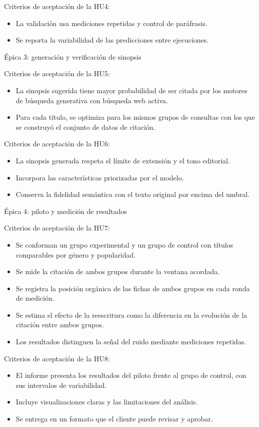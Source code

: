 \documentclass[
11pt, %
codirector, %
]{charter}
\begin{document}
Criterios de aceptación de la HU4:
\begin{itemize}
	\item La validación usa mediciones repetidas y control de paráfrasis.
	\item Se reporta la variabilidad de las predicciones entre ejecuciones.
\end{itemize}

Épica 3: generación y verificación de sinopsis

Criterios de aceptación de la HU5:
\begin{itemize}
	\item La sinopsis sugerida tiene mayor probabilidad de ser citada por los motores de búsqueda generativa con búsqueda web activa.
	\item Para cada título, se optimiza para los mismos grupos de consultas con los que se construyó el conjunto de datos de citación.
\end{itemize}

Criterios de aceptación de la HU6:
\begin{itemize}
	\item La sinopsis generada respeta el límite de extensión y el tono editorial.
	\item Incorpora las características priorizadas por el modelo.
	\item Conserva la fidelidad semántica con el texto original por encima del umbral.
\end{itemize}


Épica 4: piloto y medición de resultados

Criterios de aceptación de la HU7:
\begin{itemize}
	\item Se conforman un grupo experimental y un grupo de control con títulos comparables por género y popularidad.
	\item Se mide la citación de ambos grupos durante la ventana acordada.
	\item Se registra la posición orgánica de las fichas de ambos grupos en cada ronda de medición.
	\item Se estima el efecto de la reescritura como la diferencia en la evolución de la citación entre ambos grupos.
	\item Los resultados distinguen la señal del ruido mediante mediciones repetidas.
\end{itemize}

Criterios de aceptación de la HU8:
\begin{itemize}
	\item El informe presenta los resultados del piloto frente al grupo de control, con sus intervalos de variabilidad.
	\item Incluye visualizaciones claras y las limitaciones del análisis.
	\item Se entrega en un formato que el cliente puede revisar y aprobar.
\end{itemize}
\end{document}
